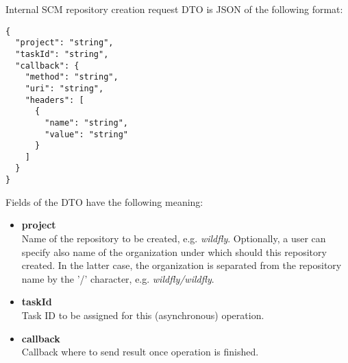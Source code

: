 \documentclass[../main.tex]{subfiles}
\begin{document}
Internal SCM repository creation request DTO is JSON of the following format:

\begin{lstlisting}[numbers=none]
{
  "project": "string",
  "taskId": "string",
  "callback": {
    "method": "string",
    "uri": "string",
    "headers": [
      {
        "name": "string",
        "value": "string"
      }
    ]
  }
}
\end{lstlisting}

Fields of the DTO have the following meaning:
\begin{itemize}
    \item \textbf{project}\\
    Name of the repository to be created, e.g. \textit{wildfly}. Optionally, a user can specify also name of the organization under which should this repository created. In the latter case, the organization is separated from the repository name by the '/' character, e.g. \textit{wildfly/wildfly}.

    \item \textbf{taskId}\\
    Task ID to be assigned for this (asynchronous) operation.

    \item \textbf{callback}\\
    Callback where to send result once operation is finished.
\end{itemize}
\end{document}
